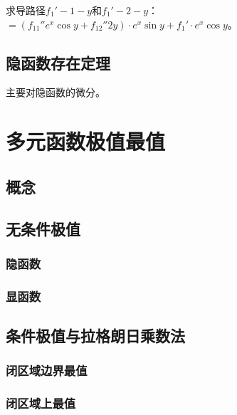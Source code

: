 \documentclass[UTF8, 12pt]{ctexart}
\begin{document}
求导路径$f_1'-1-y$和$f_1'-2-y$：$=(f_{11}''e^x\cos y+f_{12}''2y)\cdot e^x\sin y+f_1'\cdot e^x\cos y$。

\subsection{隐函数存在定理}

主要对隐函数的微分。

\section{多元函数极值最值}

\subsection{概念}

\subsection{无条件极值}

\subsubsection{隐函数}

\subsubsection{显函数}

\subsection{条件极值与拉格朗日乘数法}

\subsubsection{闭区域边界最值}

\subsubsection{闭区域上最值}
\end{document}
